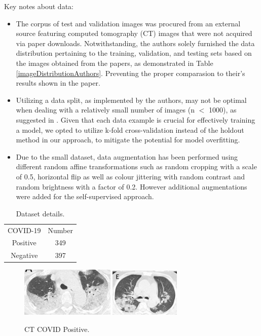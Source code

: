 \documentclass[runningheads]{llncs}
\begin{document}
Key notes about data:
\begin{itemize}
  \item The corpus of test and validation images was procured from an external source featuring computed tomography (CT) images that were not acquired via paper downloads. Notwithstanding, the authors solely furnished the data distribution pertaining to the training, validation, and testing sets based on the images obtained from the papers, as demonstrated in Table \ref{imageDistributionAuthors}. Preventing the proper comparasion to their's results shown in the paper.
  \item Utilizing a data split, as implemented by the authors, may not be optimal when dealing with a relatively small number of images (n $<$ 1000), as suggested in \cite{kfoldcrossvalidationN1000}. Given that each data example is crucial for effectively training a model, we opted to utilize k-fold cross-validation instead of the holdout method in our approach, to mitigate the potential for model overfitting.
  \item Due to the small dataset, data augmentation has been performed using different random affine transformations such as random cropping with a scale of 0.5, horizontal flip as well as colour jittering with random contrast and random brightness with a factor of 0.2. However additional augmentations were added for the self-supervised approach.
\end{itemize}

\begin{table}[h]
\label{imageDetails}
\centering
\caption{Dataset details.}
\begin{tabular}{c|c}
\cline{1-2}
 COVID-19 & Number \\ \cline{1-2}
 Positive & 349 \\ \cline{1-2}
 Negative & 397  \\ \cline{1-2}
\end{tabular}
\end{table} 

\begin{figure}[h]
\centering
{
\includegraphics[width=0.40\textwidth]{imagesDatasetSection/covid1.png}
}
\quad
{
\includegraphics[width=0.30\textwidth]{imagesDatasetSection/covid2.png}
}
\label{covidPositive}
\caption{CT COVID Positive.}
\end{figure}
\end{document}
